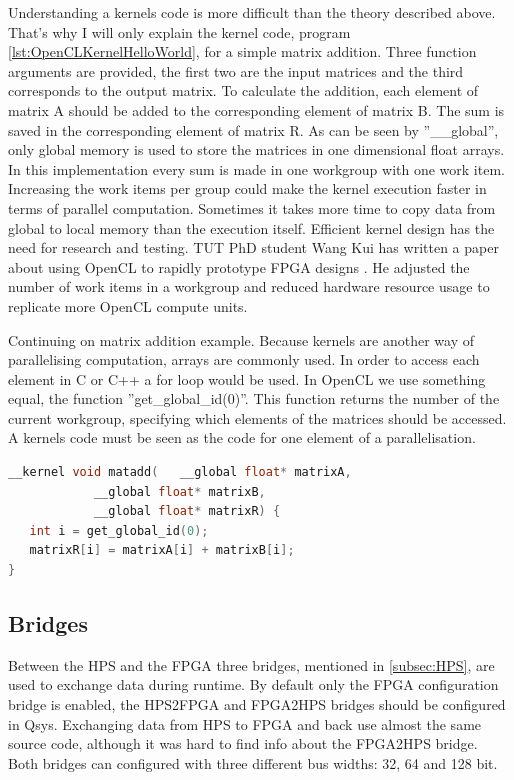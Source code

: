 \documentclass[12pt,a4paper,english,twoside,openright]{tutthesis}
\begin{document}
Understanding a kernels code is more difficult than the theory described above. That's why I will only explain the kernel code, program \ref{lst:OpenCLKernelHelloWorld}, for a simple matrix addition. Three function arguments are provided, the first two are the input matrices and the third corresponds to the output matrix. To calculate the addition, each element of matrix A should be added to the corresponding element of matrix B. The sum is saved in the corresponding element of matrix R. As can be seen by ''\_\_global'', only global memory is used to store the matrices in one dimensional float arrays. In this implementation every sum is made in one workgroup with one work item. Increasing the work items per group could make the kernel execution faster in terms of parallel computation. Sometimes it takes more time to copy data from global to local memory than the execution itself. Efficient kernel design has the need for research and testing. TUT PhD student Wang Kui has written a paper about using OpenCL to rapidly prototype FPGA designs \cite{usingOpenCLToRapidalyPrototypeFPGADesigns}. He adjusted the number of work items in a workgroup and reduced hardware resource usage to replicate more OpenCL compute units.

Continuing on matrix addition example. Because kernels are another way of parallelising computation, arrays are commonly used. In order to access each element in C or C++ a for loop would be used. In OpenCL we use something equal, the function ''get\_global\_id(0)''. This function returns the number of the current workgroup, specifying which elements of the matrices should be accessed. A kernels code must be seen as the code for one element of a parallelisation.
\begin{lstlisting}[caption={OpenCL kernel example: matrix addition},label={lst:OpenCLKernelHelloWorld},language=C, float=h]
__kernel void matadd(	__global float* matrixA,
 			__global float* matrixB,
  			__global float* matrixR) {
   int i = get_global_id(0);
   matrixR[i] = matrixA[i] + matrixB[i];
}
\end{lstlisting}
		\subsection{Bridges}
Between the HPS and the FPGA three bridges, mentioned in \ref{subsec:HPS}, are used to exchange data during runtime. By default only the FPGA configuration bridge is enabled, the HPS2FPGA and FPGA2HPS bridges should be configured in Qsys. Exchanging data from HPS to FPGA and back use almost the same source code, although it was hard to find info about the FPGA2HPS bridge. Both bridges can configured with three different bus widths: 32, 64 and 128 bit.
\end{document}
